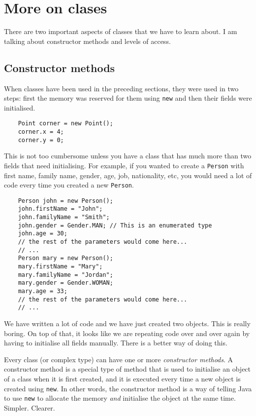 
\section{More on clases}
\label{sec:more-clases}

There are two important aspects of classes that we have to learn
about. I am talking about constructor methods and levels of access. 

\subsection{Constructor methods}
\label{sec:constructor-methods}

When classes have been used in the preceding sections, they were used
in two steps: first the memory was reserved for them using \verb+new+
and then their fields were initialised. 

\begin{verbatim}
    Point corner = new Point();
    corner.x = 4;
    corner.y = 0;
\end{verbatim}

This is not too cumbersome unless you have a class that has much more
than two fields that need initialising. For example, if you wanted to
create a \verb+Person+ with first name, family name, gender, age, job,
nationality, etc, you would need a lot of code every time you created
a new \verb+Person+. 

\begin{verbatim}
    Person john = new Person();
    john.firstName = "John";
    john.familyName = "Smith";
    john.gender = Gender.MAN; // This is an enumerated type
    john.age = 30;
    // the rest of the parameters would come here...
    // ...
    Person mary = new Person();
    mary.firstName = "Mary";
    mary.familyName = "Jordan";
    mary.gender = Gender.WOMAN;
    mary.age = 33;
    // the rest of the parameters would come here...
    // ...
\end{verbatim}

We have written a lot of code and we have just created two
objects. This is really boring. On top of that, it looks like we are
repeating code over and over again by having to initialise all fields
manually. There is a better way of doing this. 

Every class (or complex type) can have one or more \emph{constructor
  methods}. A constructor method is a special type of method that is
used to initialise an object of a class when it is first created, and
it is executed every time a new object is created using \verb+new+. In
other words, the constructor method is a way of telling Java to use
\verb+new+ to allocate the memory \emph{and} initialise the object
at the same time. Simpler. Clearer. 

